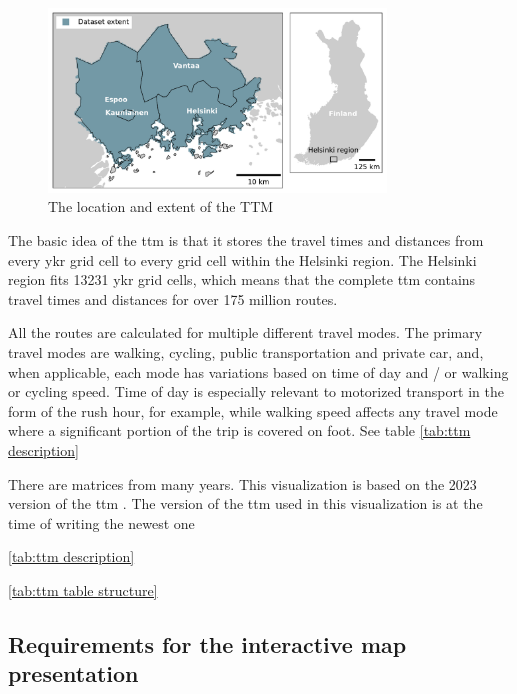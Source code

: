 \begin{figure}[H]
	\centering
	\includegraphics[width=0.8\textwidth]{visual/figures/ttm/ttm_extent.pdf}
	\caption{The location and extent of the TTM}
	\label{fig:ttm extent}
\end{figure}

The basic idea of the \acrshort{ttm} is that it stores the travel times and distances
from every \acrshort{ykr} grid cell to every grid cell within the Helsinki region.
The Helsinki region fits 13231 \acrshort{ykr} grid cells,
which means that the complete \acrshort{ttm} contains travel times and distances for
over 175 million routes.

All the routes are calculated for multiple different travel modes.
The primary travel modes are walking, cycling, public transportation and private car,
and, when applicable, each mode has variations based on
time of day and / or walking or cycling speed.
Time of day is especially relevant to motorized transport
in the form of the rush hour, for example,
while walking speed affects any travel mode
where a significant portion of the trip is covered on foot.
See table \ref{tab:ttm description} 


There are matrices from many years.
This visualization is based on the 2023 version of the \acrshort{ttm}
\parencite{fin2023}.
The version of the \acrshort{ttm} used in this visualization is at the time of writing the newest one

\ref{tab:ttm description}



\ref{tab:ttm table structure}



\subsection{Requirements for the interactive map presentation}

